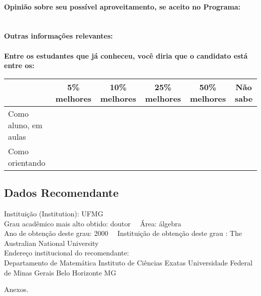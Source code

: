 \documentclass[11pt]{article}
\begin{document}
\\
\textbf{Opinião sobre seu possível aproveitamento, se aceito no Programa:}
\\\\ 
\\
\textbf{Outras informações relevantes:} \\
\\[0.3cm]
\textbf{Entre os estudantes que já conheceu, você diria que o candidato está entre os:}
\\
\begin{tabular}{|l|c|c|c|c|c|}
\hline
 & 5\% melhores & 10\% melhores & 25\% melhores & 50\% melhores & Não sabe \\
\hline
Como aluno, em aulas &  &  &  &  & \\
\hline
Como orientando &  &  &  &  & \\
\hline
\end{tabular}
\subsection*{Dados Recomendante} 
	Instituição (Institution): UFMG
\\ 
	Grau acadêmico mais alto obtido: doutor
	\ \ Área: álgebra
	\\
	Ano de obtenção deste grau: 2000
	\ \ 
	Instituição de obtenção deste grau : The Australian National University
	\\ 
	Endereço institucional do recomendante: \\ Departamento de Matemática
Instituto de Ciências Exatas
Universidade Federal de Minas Gerais
Belo Horizonte MG 
\begin{center}
Anexos.
\end{center}
\end{document}
